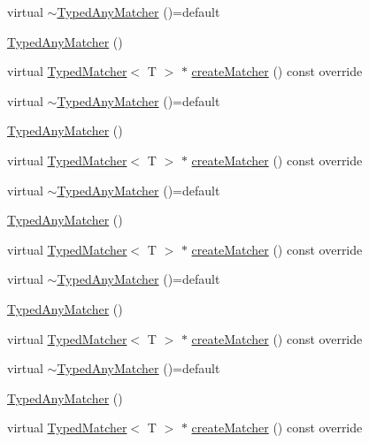 \begin{DoxyCompactItemize}
\item 
virtual \mbox{\hyperlink{structfakeit_1_1internal_1_1TypedAnyMatcher_a52af9fb206f668d7cfe238758132a531}{$\sim$\+Typed\+Any\+Matcher}} ()=default
\item 
\mbox{\hyperlink{structfakeit_1_1internal_1_1TypedAnyMatcher_a8b569fe8bfe34ad8e9a893ebc13cea52}{Typed\+Any\+Matcher}} ()
\item 
virtual \mbox{\hyperlink{structfakeit_1_1TypedMatcher}{Typed\+Matcher}}$<$ T $>$ $\ast$ \mbox{\hyperlink{structfakeit_1_1internal_1_1TypedAnyMatcher_a4306295a5059d27896ccb3370275c4ce}{create\+Matcher}} () const override
\item 
virtual \mbox{\hyperlink{structfakeit_1_1internal_1_1TypedAnyMatcher_a52af9fb206f668d7cfe238758132a531}{$\sim$\+Typed\+Any\+Matcher}} ()=default
\item 
\mbox{\hyperlink{structfakeit_1_1internal_1_1TypedAnyMatcher_a8b569fe8bfe34ad8e9a893ebc13cea52}{Typed\+Any\+Matcher}} ()
\item 
virtual \mbox{\hyperlink{structfakeit_1_1TypedMatcher}{Typed\+Matcher}}$<$ T $>$ $\ast$ \mbox{\hyperlink{structfakeit_1_1internal_1_1TypedAnyMatcher_a4306295a5059d27896ccb3370275c4ce}{create\+Matcher}} () const override
\item 
virtual \mbox{\hyperlink{structfakeit_1_1internal_1_1TypedAnyMatcher_a52af9fb206f668d7cfe238758132a531}{$\sim$\+Typed\+Any\+Matcher}} ()=default
\item 
\mbox{\hyperlink{structfakeit_1_1internal_1_1TypedAnyMatcher_a8b569fe8bfe34ad8e9a893ebc13cea52}{Typed\+Any\+Matcher}} ()
\item 
virtual \mbox{\hyperlink{structfakeit_1_1TypedMatcher}{Typed\+Matcher}}$<$ T $>$ $\ast$ \mbox{\hyperlink{structfakeit_1_1internal_1_1TypedAnyMatcher_a4306295a5059d27896ccb3370275c4ce}{create\+Matcher}} () const override
\item 
virtual \mbox{\hyperlink{structfakeit_1_1internal_1_1TypedAnyMatcher_a52af9fb206f668d7cfe238758132a531}{$\sim$\+Typed\+Any\+Matcher}} ()=default
\item 
\mbox{\hyperlink{structfakeit_1_1internal_1_1TypedAnyMatcher_a8b569fe8bfe34ad8e9a893ebc13cea52}{Typed\+Any\+Matcher}} ()
\item 
virtual \mbox{\hyperlink{structfakeit_1_1TypedMatcher}{Typed\+Matcher}}$<$ T $>$ $\ast$ \mbox{\hyperlink{structfakeit_1_1internal_1_1TypedAnyMatcher_a4306295a5059d27896ccb3370275c4ce}{create\+Matcher}} () const override
\item 
virtual \mbox{\hyperlink{structfakeit_1_1internal_1_1TypedAnyMatcher_a52af9fb206f668d7cfe238758132a531}{$\sim$\+Typed\+Any\+Matcher}} ()=default
\item 
\mbox{\hyperlink{structfakeit_1_1internal_1_1TypedAnyMatcher_a8b569fe8bfe34ad8e9a893ebc13cea52}{Typed\+Any\+Matcher}} ()
\item 
virtual \mbox{\hyperlink{structfakeit_1_1TypedMatcher}{Typed\+Matcher}}$<$ T $>$ $\ast$ \mbox{\hyperlink{structfakeit_1_1internal_1_1TypedAnyMatcher_a4306295a5059d27896ccb3370275c4ce}{create\+Matcher}} () const override
\end{DoxyCompactItemize}


